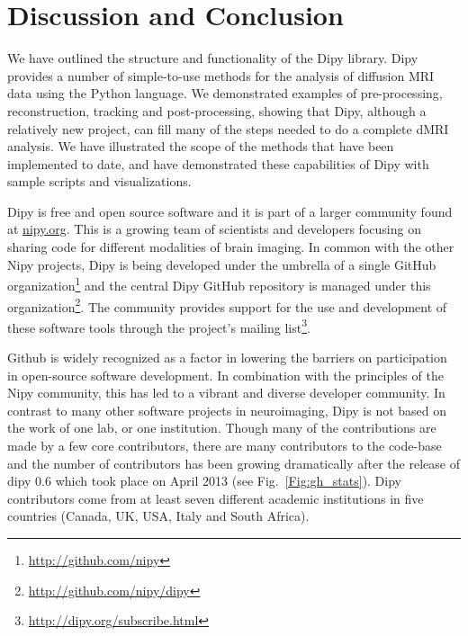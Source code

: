 \documentclass{bioinfo}
\begin{document}
\section{Discussion and Conclusion}

We have outlined the structure and functionality of the Dipy library.  Dipy
provides a number of simple-to-use methods for the analysis of diffusion MRI data using the Python
language. We demonstrated examples of pre-processing, reconstruction, tracking and post-processing,
showing that Dipy, although a relatively new project, can fill many of the steps needed to do a complete
dMRI analysis. We have illustrated the scope of the methods that have been implemented to date, and have
demonstrated these capabilities of Dipy with sample scripts and visualizations.

Dipy is free and open source software and it is part of a larger community found at \url{nipy.org}.
This is a growing team of scientists and developers focusing on sharing code for different modalities
of brain imaging. In common with the other Nipy projects, Dipy is being developed under the
umbrella of a single GitHub organization\footnote{\url{http://github.com/nipy}} and the central
Dipy GitHub repository is managed under this organization\footnote{\url{http://github.com/nipy/dipy}}.
The community provides support for the use and development of these software tools through
the project's mailing list\footnote{\url{http://dipy.org/subscribe.html}}.

Github is widely recognized as a factor in lowering the barriers on
participation in open-source software development. In combination with
the principles of the Nipy community, this has led to a vibrant and diverse
developer community. In contrast to many other software projects in
neuroimaging, Dipy is not based on the work of one lab, or one institution. Though
many of the contributions are made by a few core contributors, there are many
contributors to the code-base and the number of contributors has been growing
dramatically after the release of dipy 0.6 which took place on April 2013 (see
Fig.~\ref{Fig:gh_stats}).
Dipy contributors come from at least seven different academic
institutions in five countries (Canada, UK, USA, Italy and South Africa).
\end{document}
